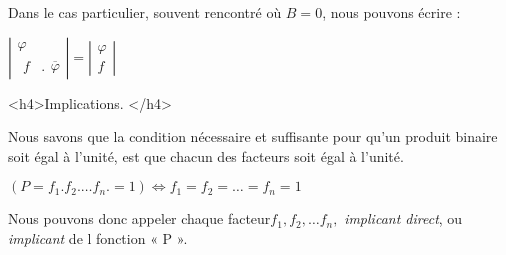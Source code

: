 Dans le cas particulier, souvent rencontré où $B=0$, nous pouvons
écrire : 

\begin{center}
$\left|\begin{array}{c}
\varphi\\
\begin{array}{cc}
f & .\end{array}\overline{\varphi}
\end{array}\right|=\left|\begin{array}{c}
\varphi\\
f
\end{array}\right|$
\end{center}

<h4>Implications. </h4>

Nous savons que la condition nécessaire et suffisante pour qu'un produit
binaire soit égal à l'unité, est que chacun des facteurs soit égal
à l'unité.

\begin{center}
$(P=f_{1}.f_{2}.\ldots f_{n}.=1)\Longleftrightarrow f_{1}=f_{2}=\ldots=f_{n}=1$
\end{center}

Nous pouvons donc appeler chaque facteur$f_{1},f_{2},\ldots f_{n},$
\emph{implicant direct}, ou \emph{implicant }de l fonction «  P  »{}.

